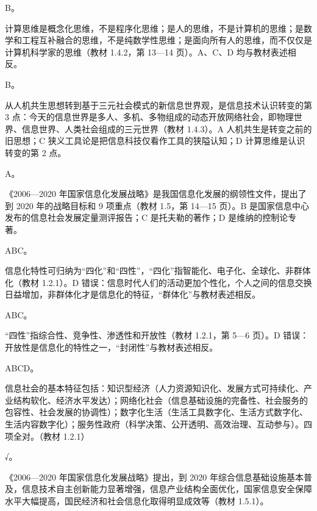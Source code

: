 \documentclass[a4paper,11pt]{article}
\begin{document}
\q B。\begin{analysis}计算思维是概念化思维，不是程序化思维；是人的思维，不是计算机的思维；是数学和工程互补融合的思维，不是纯数学性思维；是面向所有人的思维，而不仅仅是计算机科学家的思维（教材 1.4.2，第 13—14 页）。A、C、D 均与教材表述相反。\end{analysis}

\q B。\begin{analysis}从人机共生思想转到基于三元社会模式的新信息世界观，是信息技术认识转变的第 3 点：今天的信息世界是多人、多机、多物组成的动态开放网络社会，即物理世界、信息世界、人类社会组成的三元世界（教材 1.4.3）。A 人机共生是转变之前的旧思想；C 狭义工具论是把信息科技仅看作工具的狭隘认知；D 计算思维是认识转变的第 2 点。\end{analysis}

\q A。\begin{analysis}《2006—2020 年国家信息化发展战略》是我国信息化发展的纲领性文件，提出了到 2020 年的战略目标和 9 项重点（教材 1.5，第 14—15 页）。B 是国家信息中心发布的信息社会发展定量测评报告；C 是托夫勒的著作；D 是维纳的控制论专著。\end{analysis}


\q ABC。\begin{analysis}信息化特性可归纳为“四化”和“四性”，“四化”指智能化、电子化、全球化、非群体化（教材 1.2.1）。D 错误：信息时代人们的活动更加个性化，个人之间的信息交换日益增加，非群体化才是信息化的特征，“群体化”与教材表述相反。\end{analysis}

\q ABC。\begin{analysis}“四性”指综合性、竞争性、渗透性和开放性（教材 1.2.1，第 5—6 页）。D 错误：开放性是信息化的特性之一，“封闭性”与教材表述相反。\end{analysis}

\q ABCD。\begin{analysis}信息社会的基本特征包括：知识型经济（人力资源知识化、发展方式可持续化、产业结构软化、经济水平发达）；网络化社会（信息基础设施的完备性、社会服务的包容性、社会发展的协调性）；数字化生活（生活工具数字化、生活方式数字化、生活内容数字化）；服务性政府（科学决策、公开透明、高效治理、互动参与）。四项全对。（教材 1.2.1）\end{analysis}


\q √。\begin{analysis}《2006—2020 年国家信息化发展战略》提出，到 2020 年综合信息基础设施基本普及，信息技术自主创新能力显著增强，信息产业结构全面优化，国家信息安全保障水平大幅提高，国民经济和社会信息化取得明显成效等（教材 1.5.1）。\end{analysis}
\end{document}
